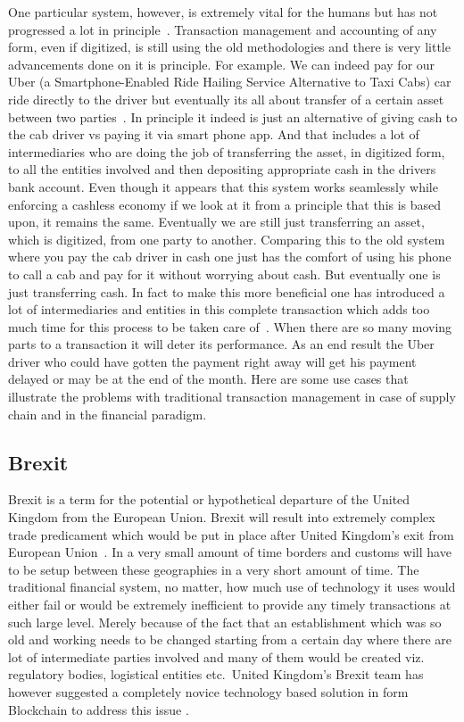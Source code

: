 One particular system, however, is extremely vital for the humans but
has not progressed a lot in principle~\cite{lionelshriver2}.
Transaction management and accounting of any form, even if digitized,
is still using the old methodologies and there is very little
advancements done on it is principle. For example. We can indeed pay
for our Uber (a Smartphone-Enabled Ride Hailing
  Service Alternative to Taxi Cabs) car ride directly to the driver
but eventually its all about transfer of a certain asset between two
parties~\cite{uber3}. In principle it indeed is just an alternative of
giving cash to the cab driver vs paying it via smart phone app. And
that includes a lot of intermediaries who are doing the job of
transferring the asset, in digitized form, to all the entities
involved and then depositing appropriate cash in the drivers bank
account. Even though it appears that this system works seamlessly
while enforcing a cashless economy if we look at it from a principle
that this is based upon, it remains the same. Eventually we are still
just transferring an asset, which is digitized, from one party to
another. Comparing this to the old system where you pay the cab driver
in cash one just has the comfort of using his phone to call a cab and
pay for it without worrying about cash. But eventually one is just
transferring cash. In fact to make this more beneficial one has
introduced a lot of intermediaries and entities in this complete
transaction which adds too much time for this process to be taken care
of~\cite{tapscott1}. When there are so many moving parts to a
transaction it will deter its performance. As an end result the Uber
driver who could have gotten the payment right away will get his payment
delayed or may be at the end of the month. Here are some use cases
that illustrate the problems with traditional transaction management
in case of supply chain and in the financial paradigm.

\subsection{Brexit}

Brexit is a term for the potential or hypothetical departure of
  the United Kingdom from the European Union. Brexit will result into
extremely complex trade predicament which would be put in place after
United Kingdom's exit from European Union~\cite{nicolasbotton4}. In a
very small amount of time borders and customs will have to be setup
between these geographies in a very short amount of time. The
traditional financial system, no matter, how much use of technology it
uses would either fail or would be extremely inefficient to provide
any timely transactions at such large level. Merely because of the
fact that an establishment which was so old and working needs to be
changed starting from a certain day where there are lot of
intermediate parties involved and many of them would be created viz.
regulatory bodies, logistical entities etc.\ United Kingdom's Brexit
team has however suggested a completely novice technology based
solution in form Blockchain to address this issue
\cite{nicolasbotton4}.

